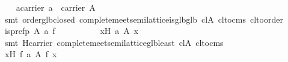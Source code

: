 \begin{isabellebody}
\ \ \isamarkupfalse%
\ a{}carrier{}\ {}{}a\ {}\ carrier\ A{}\isanewline
\ \ \ \ \isamarkupfalse%
\ {}smt\ order{}glb{}closed\ complete{}meet{}semilattice{}is{}glb{}glb\ cl{}A\ cl{}to{}cms\ cl{}to{}order{}\isanewline
\isanewline
\ \ \isamarkupfalse%
\ {}is{}pre{}fp\ A\ {}a\ f{}\isanewline
\ \ \isamarkupfalse%
\ {}\isanewline
\ \ \ \ \isamarkupfalse%
\ {}{}x{}{}H{}\ {}a\ {}\isactrlbsub A\isactrlesub \ x{}\ \isamarkupfalse%
\ {}smt\ H{}carrier\ complete{}meet{}semilattice{}glb{}least\ cl{}A\ cl{}to{}cms{}\isanewline
\ \ \ \ \isamarkupfalse%
\ {}{}x{}{}H{}\ f\ {}a\ {}\isactrlbsub A\isactrlesub \ f\ x{}\ \isamarkupfalse%

\end{isabellebody}
